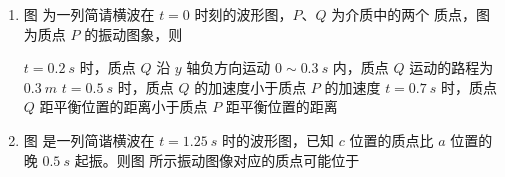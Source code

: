 

\begin{enumerate}
	\item
{}
图  为一列简请横波在 $ t=0 $ 时刻的波形图，$ P $、$ Q $ 为介质中的两个
质点，图  为质点 $ P $ 的振动图象，则  

\begin{figure}[h!]
	\centering
\begin{subfigure}{0.4\linewidth}
	\centering
	 
	\caption{}\label{2019浙江振动a}
\end{subfigure}
\begin{subfigure}{0.4\linewidth}
	\centering
	 
	\caption{}\label{2019浙江振动b}
\end{subfigure}
\end{figure}

\fourchoices
{$ t=0.2 \ s $ 时，质点 $ Q $ 沿 $ y $ 轴负方向运动}
{$ 0 \sim 0.3 \ s $ 内，质点 $ Q $ 运动的路程为 $ 0.3 \ m $}
{$ t=0.5 \ s $ 时，质点 $ Q $ 的加速度小于质点 $ P $ 的加速度}
{$ t=0.7 \ s $ 时，质点 $ Q $ 距平衡位置的距离小于质点 $ P $ 距平衡位置的距离}



\item 
{}
图  是一列简谐横波在 $ t=1.25 \ s $ 时的波形图，已知 $ c $ 位置的质点比 $ a $ 位置的晚 $ 0.5 \ s $ 起振。则图 
所示振动图像对应的质点可能位于  
\begin{figure}[h!]
	\centering
\begin{subfigure}{0.4\linewidth}
	\centering
	 
	\caption{}\label{2013四川05a}
\end{subfigure}
\begin{subfigure}{0.4\linewidth}
	\centering
	 
	\caption{}\label{2013四川05b}
\end{subfigure}
\end{figure}


\end{enumerate}
